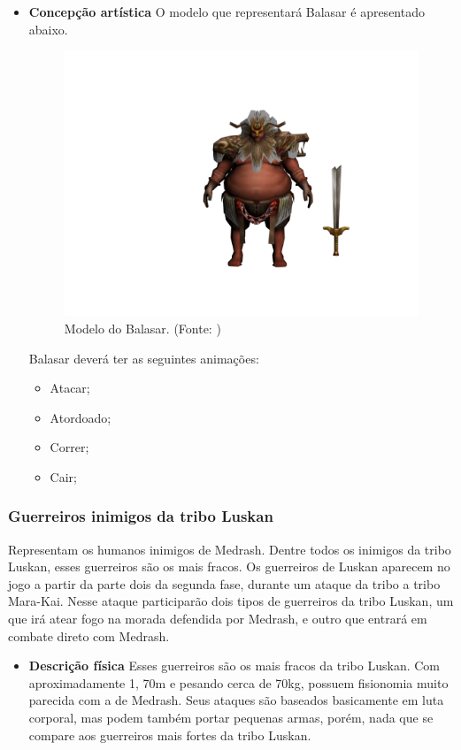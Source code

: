 \begin{itemize}
\item{\bf Concepção artística} O modelo que representará Balasar é apresentado abaixo.
 \begin{figure}[H]
 \centering
 \includegraphics[scale=0.33]{Imagens/inimigo01.png}
 \caption{Modelo do Balasar. (Fonte: \cite{bib:balasar01})}
\label{img:balasar}
\end{figure}

Balasar deverá ter as seguintes animações: 
\begin{itemize}
\item {Atacar;}
\item {Atordoado;}
\item {Correr;}
\item {Cair;}
\end{itemize}
\end{itemize}
\subsubsection{Guerreiros inimigos da tribo Luskan}
Representam os humanos inimigos de Medrash. Dentre todos os inimigos da tribo Luskan, esses guerreiros são os mais fracos. Os guerreiros de Luskan aparecem no jogo a partir da parte dois da segunda fase, durante um ataque da tribo a tribo Mara-Kai. Nesse ataque participarão dois tipos de guerreiros da tribo Luskan, um que irá atear fogo na morada defendida por Medrash, e outro que entrará em combate direto com Medrash.

\begin{itemize}
\item{\bf Descrição física}
Esses guerreiros são os mais fracos da tribo Luskan. Com aproximadamente 1, 70m e pesando cerca de 70kg, possuem fisionomia muito parecida com a de Medrash. Seus ataques são baseados basicamente em luta corporal, mas podem também portar pequenas armas, porém, nada que se compare aos guerreiros mais fortes da tribo Luskan.
\end{itemize}

